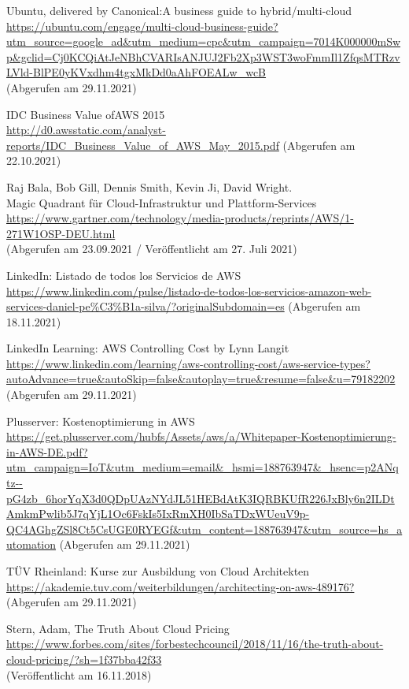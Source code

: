 \begin{thebibliography}{HR08}
   Ubuntu, delivered by Canonical:A business guide to hybrid/multi-cloud\\
  \url{https://ubuntu.com/engage/multi-cloud-business-guide?utm_source=google_ad&utm_medium=cpc&utm_campaign=7014K000000mSwp&gclid=Cj0KCQiAtJeNBhCVARIsANJUJ2Fb2Xp3WST3woFmmIl1ZfqsMTRzvLVld-BlPE0yKVxdhm4tgxMkDd0aAhFOEALw_wcB}\\
  (Abgerufen am 29.11.2021)

   IDC Business Value ofAWS 2015\\
 \url{http://d0.awsstatic.com/analyst-reports/IDC_Business_Value_of_AWS_May_2015.pdf}
 (Abgerufen am 22.10.2021)

  Raj Bala, Bob Gill, Dennis Smith, Kevin Ji, David Wright.\\ 
  Magic Quadrant für Cloud-Infrastruktur und Plattform-Services \\
  \url{https://www.gartner.com/technology/media-products/reprints/AWS/1-271W1OSP-DEU.html}
  \\(Abgerufen am 23.09.2021 / Veröffentlicht am 27. Juli 2021)

  LinkedIn: Listado de todos los Servicios de AWS\\
 \url{https://www.linkedin.com/pulse/listado-de-todos-los-servicios-amazon-web-services-daniel-pe%C3%B1a-silva/?originalSubdomain=es}
 (Abgerufen am 18.11.2021)

  LinkedIn Learning: AWS Controlling Cost by Lynn Langit\\
 \url{https://www.linkedin.com/learning/aws-controlling-cost/aws-service-types?autoAdvance=true&autoSkip=false&autoplay=true&resume=false&u=79182202}
 (Abgerufen am 29.11.2021)

  Plusserver: Kostenoptimierung in AWS\\
 \url{https://get.plusserver.com/hubfs/Assets/aws/a/Whitepaper-Kostenoptimierung-in-AWS-DE.pdf?utm_campaign=IoT&utm_medium=email&_hsmi=188763947&_hsenc=p2ANqtz--pG4zb_6horYqX3d0QDpUAzNYdJL51HEBdAtK3IQRBKUfR226JxBly6n2ILDtAmkmPwlib5J7qYjL1Oc6FskIs5IxRmXH0IbSaTDxWUeuV9p-QC4AGhgZSl8Ct5CsUGE0RYEGf&utm_content=188763947&utm_source=hs_automation}
 (Abgerufen am 29.11.2021)

  TÜV Rheinland: Kurse zur Ausbildung von Cloud Architekten\\
 \url{https://akademie.tuv.com/weiterbildungen/architecting-on-aws-489176?}
 (Abgerufen am 29.11.2021)

  Stern, Adam, The Truth About Cloud Pricing \\
  \url{https://www.forbes.com/sites/forbestechcouncil/2018/11/16/the-truth-about-cloud-pricing/?sh=1f37bba42f33}\\
  (Veröffentlicht am 16.11.2018)


\end{thebibliography}

